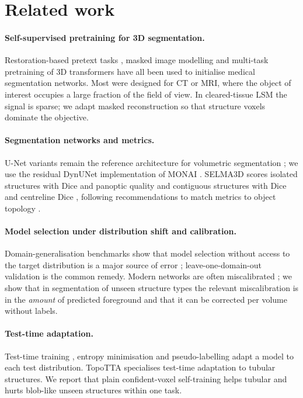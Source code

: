\documentclass[11pt,a4paper]{article}
\begin{document}
\section{Related work}

\paragraph{Self-supervised pretraining for 3D segmentation.} Restoration-based pretext tasks \cite{zhou2021modelsgenesis}, masked image modelling \cite{he2022mae,xie2022simmim} and multi-task pretraining of 3D transformers \cite{tang2022swinunetr} have all been used to initialise medical segmentation networks. Most were designed for CT or MRI, where the object of interest occupies a large fraction of the field of view. In cleared-tissue LSM the signal is sparse; we adapt masked reconstruction so that structure voxels dominate the objective.

\paragraph{Segmentation networks and metrics.} U-Net variants remain the reference architecture for volumetric segmentation \cite{ronneberger2015unet,cicek2016unet3d,isensee2021nnunet}; we use the residual DynUNet implementation of MONAI \cite{cardoso2022monai}. SELMA3D scores isolated structures with Dice and panoptic quality \cite{kirillov2019panoptic} and contiguous structures with Dice and centreline Dice \cite{shit2021cldice}, following recommendations to match metrics to object topology \cite{maierhein2024metrics}.

\paragraph{Model selection under distribution shift and calibration.} Domain-generalisation benchmarks show that model selection without access to the target distribution is a major source of error \cite{gulrajani2021domainbed}; leave-one-domain-out validation is the common remedy. Modern networks are often miscalibrated \cite{guo2017calibration}; we show that in segmentation of unseen structure types the relevant miscalibration is in the \emph{amount} of predicted foreground and that it can be corrected per volume without labels.

\paragraph{Test-time adaptation.} Test-time training \cite{sun2020ttt}, entropy minimisation \cite{wang2021tent} and pseudo-labelling \cite{lee2013pseudolabel} adapt a model to each test distribution. TopoTTA \cite{zhou2025topotta} specialises test-time adaptation to tubular structures. We report that plain confident-voxel self-training helps tubular and hurts blob-like unseen structures within one task.
\end{document}
